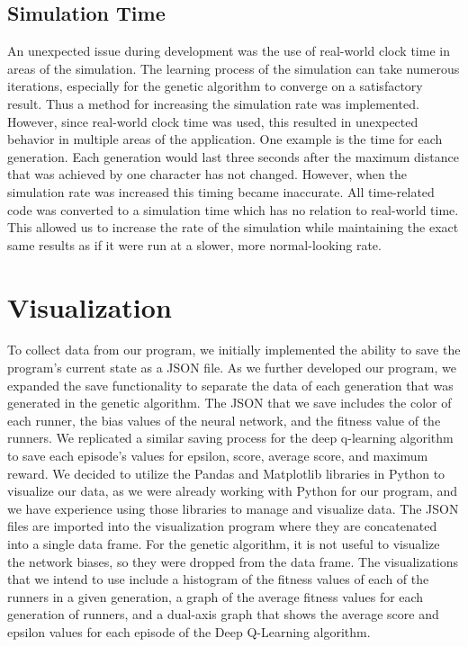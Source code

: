 \documentclass[letterpaper]{article} %
\begin{document}
\subsection{Simulation Time}

\par An unexpected issue during development was the use of real-world clock time in areas of the simulation. The learning process of the simulation can take numerous iterations, especially for the genetic algorithm to converge on a satisfactory result. Thus a method for increasing the simulation rate was implemented. However, since real-world clock time was used, this resulted in unexpected behavior in multiple areas of the application. One example is the time for each generation. Each generation would last three seconds after the maximum distance that was achieved by one character has not changed. However, when the simulation rate was increased this timing became inaccurate. All time-related code was converted to a simulation time which has no relation to real-world time. This allowed us to increase the rate of the simulation while maintaining the exact same results as if it were run at a slower, more normal-looking rate.

\section{Visualization}

\par To collect data from our program, we initially implemented the ability to save the program's current state as a JSON file. As we further developed our program, we expanded the save functionality to separate the data of each generation that was generated in the genetic algorithm. The JSON that we save includes the color of each runner, the bias values of the neural network, and the fitness value of the runners. We replicated a similar saving process for the deep q-learning algorithm to save each episode's values for epsilon, score, average score, and maximum reward. We decided to utilize the Pandas and Matplotlib libraries in Python to visualize our data, as we were already working with Python for our program, and we have experience using those libraries to manage and visualize data. The JSON files are imported into the visualization program where they are concatenated into a single data frame. For the genetic algorithm, it is not useful to visualize the network biases, so they were dropped from the data frame. The visualizations that we intend to use include a histogram of the fitness values of each of the runners in a given generation, a graph of the average fitness values for each generation of runners, and a dual-axis graph that shows the average score and epsilon values for each episode of the Deep Q-Learning algorithm.
\end{document}
